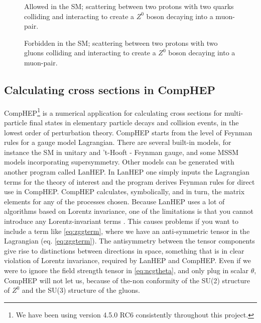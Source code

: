 \begin{figure}[htp]
	\centering
	\begin{minipage}[b]{0.475\linewidth} 
    \centering
	  
	  \caption{Allowed in the SM; scattering between two protons with two quarks colliding and interacting to create a $Z^0$ boson decaying into a muon-pair.} \label{fig:feyn:parton_qq}
	\end{minipage}
	\hspace{0.5cm}
	\begin{minipage}[b]{0.475\linewidth} 
    \centering
	  
	  \caption{Forbidden in the SM; scattering between two protons with two gluons colliding and interacting to create a $Z^0$ boson decaying into a muon-pair.} \label{fig:feyn:parton_gg}%
	\end{minipage}
\end{figure}

\subsection{Calculating cross sections in CompHEP}
CompHEP\footnote{We have been using version 4.5.0 RC6 consistently throughout this project.} is a numerical application for calculating cross sections for multi-particle final states in elementary particle decays and collision events, in the lowest order of perturbation theory. CompHEP starts from the level of Feynman rules for a gauge model Lagrangian. There are several built-in models, for instance the SM in unitary and 't-Hooft - Feynman gauge, and some MSSM models incorporating supersymmetry. Other models can be generated with another program called LanHEP. In LanHEP one simply inputs the Lagrangian terms for the theory of interest and the program derives Feynman rules for direct use in CompHEP. CompHEP calculates, symbolically, and in turn, the matrix elements for any of the processes chosen.
Because LanHEP uses a lot of algorithms based on Lorentz invariance, one of the limitations is that you cannot introduce any Lorentz-invariant terms \cite{semenov}. This causes problems if you want to include a term like \eqref{eq:zggterm}, where we have an anti-symmetric tensor in the Lagrangian (eq. \eqref{eq:zggterm}). The antisymmetry between the tensor components give rise to distinctions between directions in space, something that is in clear violation of Lorentz invariance, required by LanHEP and CompHEP. Even if we were to ignore the field strength tensor in \eqref{eq:ncgtheta}, and only plug in scalar $\theta$, CompHEP will not let us, because of the-non conformity of the SU(2) structure of $Z^0$ and the SU(3) structure of the gluons.


